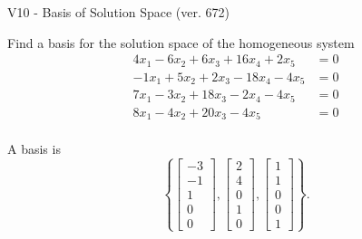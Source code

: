 \begin{exercise}
  \begin{exerciseTitle}V10 - Basis of Solution Space (ver. 672)\end{exerciseTitle}
  \begin{exerciseStatement}
    Find a basis for the solution space of the homogeneous system 
\begin{align*}
 4 x_ 1 -6 x_ 2 + 6 x_ 3 + 16 x_ 4 + 2 x_ 5 &= 0  \\ 
  -1 x_ 1 + 5 x_ 2 + 2 x_ 3 -18 x_ 4 -4 x_ 5 &= 0  \\ 
  7 x_ 1 -3 x_ 2 + 18 x_ 3 -2 x_ 4 -4 x_ 5 &= 0  \\ 
  8 x_ 1 -4 x_ 2 + 20 x_ 3 -4 x_ 5 &= 0  \\ 
 \end{align*}


 
  \end{exerciseStatement}

  \begin{exerciseAnswer}
   A basis is   
\[\left\{\left[\begin{array}{c}
-3 \\
-1 \\
1 \\
0 \\
0
\end{array}\right] , \left[\begin{array}{c}
2 \\
4 \\
0 \\
1 \\
0
\end{array}\right] , \left[\begin{array}{c}
1 \\
1 \\
0 \\
0 \\
1
\end{array}\right]\right\}.\]

  


  \end{exerciseAnswer}
\end{exercise}